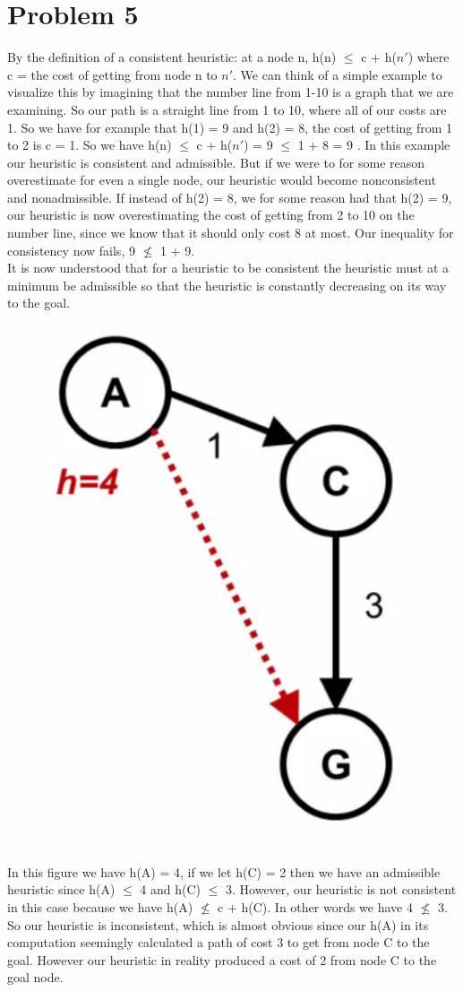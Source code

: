 \documentclass[12pt]{article}
\begin{document}
\section *{Problem 5}
By  the definition of a consistent heuristic: at a node n, h(n) $\leq$ c + h($n'$) where c = the cost of getting from node n to $n'$. We can think of a simple example to visualize this by imagining that the number line from 1-10 is a graph that we are examining. So our path is a straight line from 1 to 10, where all of our costs are 1. So we have for example that h(1) = 9 and h(2) = 8, the cost of getting from 1 to 2 is c = 1. So we have h(n) $\leq$ c + h($n'$) = 9 $\leq$ 1 + 8 = 9 \checkmark . In this example our heuristic is consistent and admissible. But if we were to for some reason overestimate for even a single node, our heuristic would become nonconsistent and nonadmissible. If instead of h(2) = 8, we for some reason had that h(2) = 9, our heuristic is now overestimating the cost of getting from 2 to 10 on the number line, since we know that it should only cost 8 at most. Our inequality for consistency now fails, 9 $\nleq$ 1 + 9. \\
It is now understood that for a heuristic to be consistent the heuristic must at a minimum be admissible so that the heuristic is constantly decreasing on its way to the goal.
\begin{figure}[!htb]
	\centering
	\includegraphics[width=.3\textwidth]{problem5.png}
\end{figure} \\
In this figure we have h(A) = 4, if we let h(C) = 2 then we have an admissible heuristic since h(A) $\leq$ 4 and h(C) $\leq$ 3. However, our heuristic is not consistent in this case because we have h(A) $\nleq$ c + h(C). In other words we have 4 $\nleq$ 3. So our heuristic is inconsistent, which is almost obvious since our h(A) in its computation seemingly calculated a path of cost 3 to get from node C to the goal. However our heuristic in reality produced a cost of 2 from node C to the goal node. \newpage
\end{document}
